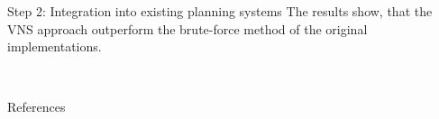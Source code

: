 \documentclass[final,hyperref={pdfpagelabels=true}]{beamer}
\newenvironment{postit}
{\begin{beamercolorbox}[sep=1em,wd=7cm]{postit}}
{\end{beamercolorbox}}
\begin{document}
\begin{frame}
\begin{columns}[t]
\begin{column}{.45\textwidth}
\begin{block}{Step 2: Integration into existing planning systems}
       The results show, that the VNS approach outperform the brute-force method of the original implementations.
       
        \begin{figure}
         \captionsetup[subfigure]{labelformat=empty} 
         \\
         \hspace{30mm}      
       \end{figure}
      \end{block}
	  
      \begin{block}{References}
        \small
        
	    
	  \end{block}

    \end{column}
  \end{columns}

        
%          
%          
%          
   
\end{frame}


   
\end{document}
